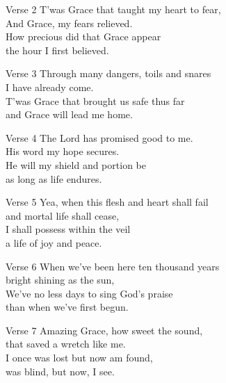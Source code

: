 \begin{frame}{Verse 2}
 \huge{
    \centering
    T'was Grace that taught my heart to fear, \\
    And Grace, my fears relieved. \\
    How precious did that Grace appear \\
    the hour I first believed. \\
}
\end{frame}

\begin{frame}{Verse 3}
 \huge{
    \centering
    Through many dangers, toils and snares \\
    I have already come. \\
    T'was Grace that brought us safe thus far \\
    and Grace will lead me home. \\
}
\end{frame}

\begin{frame}{Verse 4}
 \huge{
    \centering
    The Lord has promised good to me. \\
    His word my hope secures. \\
    He will my shield and portion be \\
    as long as life endures. \\
}
\end{frame}

\begin{frame}{Verse 5}
 \huge{
    \centering
    Yea, when this flesh and heart shall fail \\
    and mortal life shall cease, \\
    I shall possess within the veil \\
    a life of joy and peace. \\
}
\end{frame}

\begin{frame}{Verse 6}
 \huge{
    \centering
    When we've been here ten thousand years \\
    bright shining as the sun, \\
    We've no less days to sing God's praise \\
    than when we've first begun. \\
}
\end{frame}

\begin{frame}{Verse 7}
 \huge{
    \centering
    Amazing Grace, how sweet the sound, \\
    that saved a wretch like me. \\
    I once was lost but now am found, \\
    was blind, but now, I see. \\
}
\end{frame}



